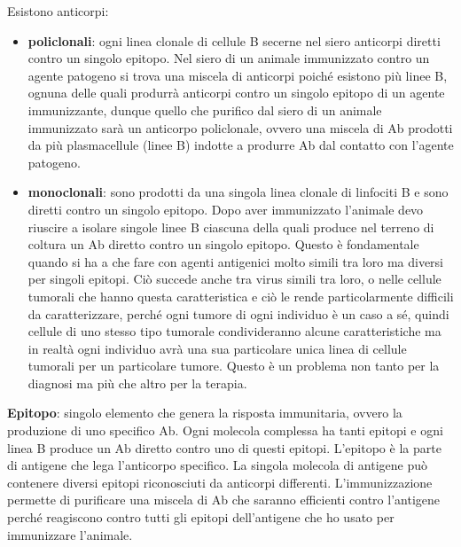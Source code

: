 \documentclass[11pt]{book}
\begin{document}
Esistono anticorpi:
\begin{itemize}
\item \textbf{policlonali}: ogni linea clonale di cellule B secerne nel siero anticorpi diretti contro un singolo epitopo. Nel siero di un animale immunizzato contro un agente patogeno si trova una miscela di anticorpi poiché esistono più linee B, ognuna delle quali produrrà anticorpi contro un singolo epitopo di un agente immunizzante, dunque quello che purifico dal siero di un animale immunizzato sarà un anticorpo policlonale, ovvero una miscela di Ab prodotti da più plasmacellule (linee B) indotte a produrre Ab dal contatto con l’agente patogeno.
      
\item \textbf{monoclonali}: sono prodotti da una singola linea clonale di linfociti B e sono diretti contro un singolo epitopo. Dopo aver immunizzato l’animale devo riuscire a isolare singole linee B ciascuna della quali produce nel terreno di coltura un Ab diretto contro un singolo epitopo. Questo è fondamentale quando si ha a che fare con agenti antigenici molto simili tra loro ma diversi per singoli epitopi. Ciò succede anche tra virus simili tra loro, o nelle cellule tumorali che hanno questa caratteristica e ciò le rende particolarmente difficili da caratterizzare, perché ogni tumore di ogni individuo è un caso a sé, quindi cellule di uno stesso tipo tumorale condivideranno alcune caratteristiche ma in realtà ogni individuo avrà una sua particolare unica linea di cellule tumorali per un particolare tumore. Questo è un problema non tanto per la diagnosi ma più che altro per la terapia.
\end{itemize}

\textbf{Epitopo}: singolo elemento che genera la risposta immunitaria, ovvero la produzione di uno specifico Ab. Ogni molecola complessa ha tanti epitopi e ogni linea B produce un Ab diretto contro uno di questi epitopi. L’epitopo è la parte di antigene che lega l'anticorpo specifico. La singola molecola di antigene può contenere diversi epitopi riconosciuti da anticorpi differenti. L’immunizzazione permette di purificare una miscela di Ab che saranno efficienti contro l’antigene perché reagiscono contro tutti gli epitopi dell’antigene che ho usato per immunizzare l’animale. 
\end{document}
